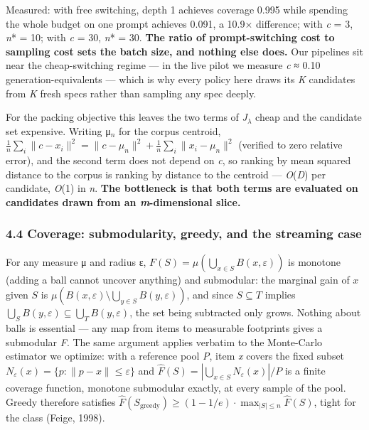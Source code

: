 \documentclass[
  10pt,
]{article}
\theoremstyle{plain}
\theoremstyle{definition}
\begin{document}
Measured: with free switching, depth 1 achieves coverage 0.995 while
spending the whole budget on one prompt achieves 0.091, a 10.9×
difference; with \emph{c} = 3, \emph{n}* = 10; with \emph{c} = 30,
\emph{n}* = 30. \textbf{The ratio of prompt-switching cost to sampling
cost sets the batch size, and nothing else does.} Our pipelines sit near
the cheap-switching regime --- in the live pilot we measure \emph{c} ≈
0.10 generation-equivalents --- which is why every policy here draws its
\emph{K} candidates from \emph{K} fresh specs rather than sampling any
spec deeply.

For the packing objective this leaves the two terms of \emph{J}\(_{λ}\)
cheap and the candidate set expensive. Writing μ\(_{n}\) for the corpus
centroid,
\(\frac{1}{n}\sum_i \lVert c - x_i\rVert^2 = \lVert c - \mu_n\rVert^2 + \frac{1}{n}\sum_i \lVert x_i - \mu_n\rVert^2\)
(verified to zero relative error), and the second term does not depend
on \emph{c}, so ranking by mean squared distance to the corpus is
ranking by distance to the centroid --- \emph{O}(\emph{D}) per
candidate, \emph{O}(1) in \emph{n}. \textbf{The bottleneck is that both
terms are evaluated on candidates drawn from an \emph{m}-dimensional
slice.}

\subsubsection{4.4 Coverage: submodularity, greedy, and the streaming
case}\label{44-coverage-submodularity-greedy-and-the-streaming-case}

For any measure μ and radius ε,
\(F(S) = \mu(\bigcup_{x \in S} B(x,\varepsilon))\) is monotone (adding a
ball cannot uncover anything) and submodular: the marginal gain of \(x\)
given \(S\) is
\(\mu(B(x,\varepsilon) \setminus \bigcup_{y \in S} B(y,\varepsilon))\),
and since \(S \subseteq T\) implies
\(\bigcup_S B(y,\varepsilon) \subseteq \bigcup_T B(y,\varepsilon)\), the
set being subtracted only grows. Nothing about balls is essential ---
any map from items to measurable footprints gives a submodular \emph{F}.
The same argument applies verbatim to the Monte-Carlo estimator we
optimize: with a reference pool \emph{P}, item \emph{x} covers the fixed
subset \(N_\varepsilon(x) = \{p : \lVert p - x\rVert \le \varepsilon\}\)
and \(\hat F(S) = |\bigcup_{x \in S} N_\varepsilon(x)|/P\) is a finite
coverage function, monotone submodular exactly, at every sample of the
pool. Greedy therefore satisfies
\(\hat F(S_{\text{greedy}}) \ge (1 - 1/e) \cdot \max_{|S| \le n} \hat F(S)\),
tight for the class (Feige, 1998).
\end{document}

